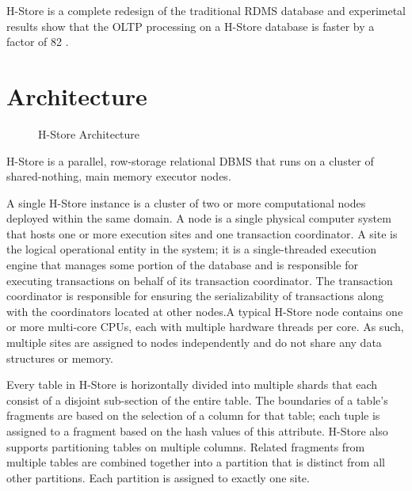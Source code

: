 \documentclass[9pt,twocolumn,twoside]{../../styles/osajnl}
\begin{document}
H-Store is a complete redesign of the traditional RDMS database and 
experimetal results show that the OLTP processing on a H-Store database is faster 
by a factor of 82 \cite{stonebraker2007}.

\section{Architecture}

\begin{figure}[http]
\centering
{}
\caption{H-Store Architecture} \cite{www-H-StoreArch}
\label{fig:false-color}
\end{figure}

H-Store is a parallel, row-storage relational DBMS that runs on a cluster of shared-nothing, main memory executor nodes.

A single H-Store instance is a cluster of two or more computational nodes deployed within the same domain. A node is a single physical computer system that hosts one or more execution sites and one transaction coordinator. A site is the logical operational entity in the system; it is a single-threaded execution engine that manages some portion of the database and is responsible for executing transactions on behalf of its transaction coordinator. The transaction coordinator is responsible for ensuring the serializability of transactions along with the coordinators located at other nodes.A typical H-Store node contains one or more multi-core CPUs, each with multiple hardware threads per core. As such, multiple sites are assigned to nodes independently and do not share any data structures or memory.

Every table in H-Store is horizontally divided into multiple shards that each consist of a disjoint sub-section of the entire table. The boundaries of a table’s fragments are based on the selection of a  column for that table; each tuple is assigned to a fragment based on the hash values of this attribute. H-Store also supports partitioning tables on multiple columns. Related fragments from multiple tables are combined together into a partition that is distinct from all other partitions. Each partition is assigned to exactly one site.
\end{document}
